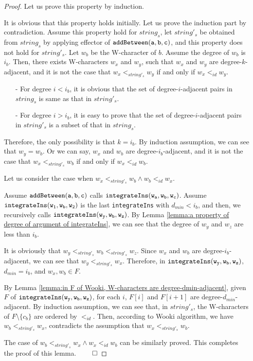 \begin {proof}
Let us prove this property by induction.

It is obvious that this property holds initially. Let us prove the induction part by contradiction. Assume this property hold for $string_s$, let $string'_s$ be obtained from $string_s$ by applying effector of $\alabelshort[{\tt addBetween}]{a,b,c}$, and this property does not hold for $string'_s$. Let $w_b$ be the W-character of $b$. Assume the degree of $w_b$ is $i_b$. Then, there exists W-characters $w_x$ and $w_y$, such that $w_x$ and $w_y$ are degree-$k$-adjacent, and it is not the case that $w_x <_{string'_s} w_y$ if and only if $w_x <_{id} w_y$.

\begin{itemize}
\setlength{\itemsep}{0.5pt}
\item[-] For degree $i<i_b$, it is obvious that the set of degree-$i$-adjacent pairs in $string_s$ is same as that in $string'_s$.

\item[-] For degree $i>i_b$, it is easy to prove that the set of degree-$i$-adjacent pairs in $string'_s$ is a subset of that in $string_s$.
\end{itemize}

Therefore, the only possibility is that $k=i_b$. By induction assumption, we can see that $w_y = w_b$. Or we can say, $w_x$ and $w_b$ are degree-$i_b$-adjacent, and it is not the case that $w_x <_{string'_s} w_b$ if and only if $w_x <_{id} w_b$.

Let us consider the case when $w_x <_{string'_s} w_b \wedge w_b <_{id} w_x$.

Assume $\alabelshort[{\tt addBetween}]{a,b,c}$ calls $\alabelshort[{\tt integrateIns}]{w_a,w_b,w_c}$. Assume $\alabelshort[{\tt integrateIns}]{w_1,w_b,w_2}$ is the last {\tt integrateIns} with $d_{min} < i_b$, and then, we recursively calls $\alabelshort[{\tt integrateIns}]{w_y,w_b,w_z}$. By Lemma \ref{lemma:a property of degree of argument of integrateIns}, we can see that the degree of $w_y$ and $w_z$ are less than $i_b$.

It is obviously that $w_y <_{string'_s} w_b <_{string'_s} w_z$. Since $w_x$ and $w_b$ are degree-$i_b$-adjacent, we can see that $w_y <_{string'_s} w_x$. Therefore, in $\alabelshort[{\tt integrateIns}]{w_y,w_b,w_z}$, $d_{min} = i_b$, and $w_x,w_b \in F$.

By Lemma \ref{lemma:in F of Wooki, W-characters are degree-dmin-adjacent}, given $F$ of $\alabelshort[{\tt integrateIns}]{w_y,w_b,w_z}$, for each $i$, $F[i]$ and $F[i+1]$ are degree-$d_{min}$-adjacent. By induction assumption, we can see that, in $string'_s$, the W-characters of $F \setminus \{ c_b \}$ are ordered by $<_{id}$. Then, according to Wooki algorithm, we have $w_b <_{string'_s} w_x$, contradicts the assumption that $w_x <_{string'_s} w_b$.

The case of $w_b <_{string'_s} w_x \wedge w_x <_{id} w_b$ can be similarly proved. This completes the proof of this lemma. $\qed$
\end {proof}


